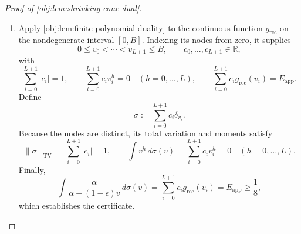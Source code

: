 \begin{proof}[Proof of \cref{obj:lem:shrinking-cone-dual}]
\begin{enumerate}
In particular,
\[
|Q_{\mathrm{app}}'(v_{\mathrm{mvt}})|\,z_{\mathrm{rec}}
\le
\frac{9L^2}{4B}\,z_{\mathrm{rec}}
=
\frac{9}{400c_\epsilon}
\le
\frac{3}{100}
<
\frac14.
\]
This contradicts the chain
\[
\frac14
<
Q_{\mathrm{app}}(0)-Q_{\mathrm{app}}(z_{\mathrm{rec}})
\le
|Q_{\mathrm{app}}(z_{\mathrm{rec}})-Q_{\mathrm{app}}(0)|
=
|Q_{\mathrm{app}}'(v_{\mathrm{mvt}})|\,z_{\mathrm{rec}}.
\]
Therefore
\[
\|g_{\mathrm{rec}}-Q_{\mathrm{app}}\|_{\infty,[0,B]}
\ge\frac18,
\qquad
E_{\mathrm{app}}\ge\frac18.
\]

\item Apply \cref{obj:lem:finite-polynomial-duality} to the continuous function \(g_{\mathrm{rec}}\) on the nondegenerate interval \([0,B]\). Indexing its nodes from zero, it supplies
\[
0\le v_0<\cdots<v_{L+1}\le B,
\qquad
c_0,\ldots,c_{L+1}\in\mathbb R,
\]
with
\[
\sum_{i=0}^{L+1}|c_i|=1,
\qquad
\sum_{i=0}^{L+1}c_i v_i^h=0
\quad (h=0,\ldots,L),
\qquad
\sum_{i=0}^{L+1}c_i g_{\mathrm{rec}}(v_i)=E_{\mathrm{app}}.
\]
Define
\[
\sigma:=\sum_{i=0}^{L+1}c_i\delta_{v_i}.
\]
Because the nodes are distinct, its total variation and moments satisfy
\[
\|\sigma\|_{\mathrm{TV}}
=
\sum_{i=0}^{L+1}|c_i|=1,
\qquad
\int v^h\,d\sigma(v)
=
\sum_{i=0}^{L+1}c_i v_i^h=0
\quad (h=0,\ldots,L).
\]
Finally,
\[
\int\frac{\alpha}{\alpha+(1-\epsilon)v}\,d\sigma(v)
=
\sum_{i=0}^{L+1}c_i g_{\mathrm{rec}}(v_i)
=
E_{\mathrm{app}}
\ge\frac18,
\]
which establishes the certificate. %
\end{enumerate}
\end{proof}
